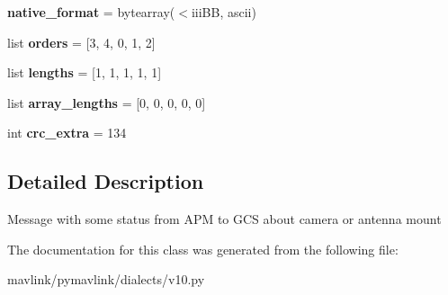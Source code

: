 \begin{DoxyCompactItemize}
\item 
\mbox{\label{classpymavlink_1_1dialects_1_1v10_1_1MAVLink__mount__status__message_abcfbea92efe44194d8723ab12d4944f7}} 
{\bfseries native\+\_\+format} = bytearray(\textquotesingle{}$<$iii\+BB\textquotesingle{}, \textquotesingle{}ascii\textquotesingle{})
\item 
\mbox{\label{classpymavlink_1_1dialects_1_1v10_1_1MAVLink__mount__status__message_a391eac933acda775f0ebf9ec52f18199}} 
list {\bfseries orders} = \mbox{[}3, 4, 0, 1, 2\mbox{]}
\item 
\mbox{\label{classpymavlink_1_1dialects_1_1v10_1_1MAVLink__mount__status__message_a6e6047e9b14eb8c40eaadd6351af7853}} 
list {\bfseries lengths} = \mbox{[}1, 1, 1, 1, 1\mbox{]}
\item 
\mbox{\label{classpymavlink_1_1dialects_1_1v10_1_1MAVLink__mount__status__message_a4cccb14ebb82b3177eda57438fa542b6}} 
list {\bfseries array\+\_\+lengths} = \mbox{[}0, 0, 0, 0, 0\mbox{]}
\item 
\mbox{\label{classpymavlink_1_1dialects_1_1v10_1_1MAVLink__mount__status__message_ac31e56fbfa3e9eff8b02712909666b12}} 
int {\bfseries crc\+\_\+extra} = 134
\end{DoxyCompactItemize}


\subsection{Detailed Description}
\begin{DoxyVerb}Message with some status from APM to GCS about camera or
antenna mount
\end{DoxyVerb}
 

The documentation for this class was generated from the following file\+:\begin{DoxyCompactItemize}
\item 
mavlink/pymavlink/dialects/v10.\+py\end{DoxyCompactItemize}
